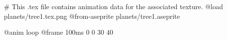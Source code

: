 # This .tex file contains animation data for the associated texture.
@load planets/tree1.tex.png
@from-aseprite planets/tree1.aseprite

@anim loop
	@frame 100ms 0 0 30 40
